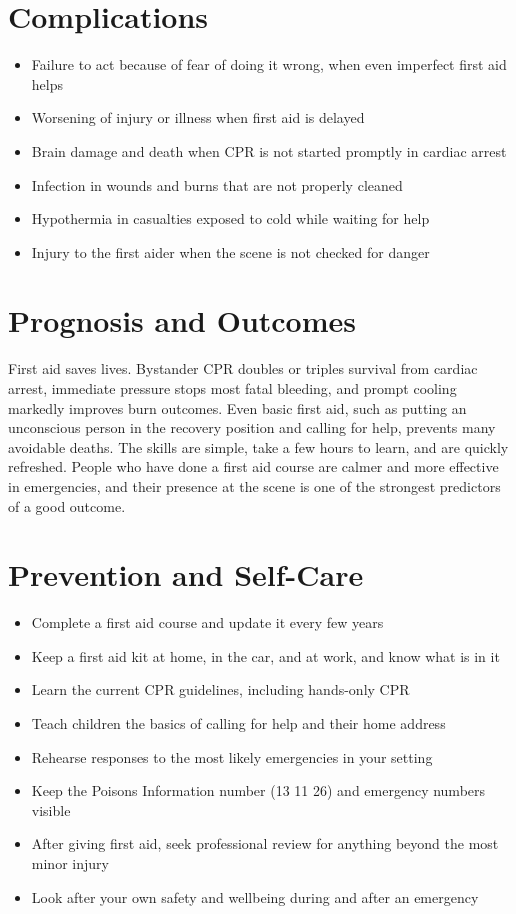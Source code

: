 \section*{Complications}
\begin{itemize}
    \item Failure to act because of fear of doing it wrong, when even imperfect first aid helps
    \item Worsening of injury or illness when first aid is delayed
    \item Brain damage and death when CPR is not started promptly in cardiac arrest
    \item Infection in wounds and burns that are not properly cleaned
    \item Hypothermia in casualties exposed to cold while waiting for help
    \item Injury to the first aider when the scene is not checked for danger
\end{itemize}

\section*{Prognosis and Outcomes}
First aid saves lives. Bystander CPR doubles or triples survival from cardiac arrest, immediate pressure stops most fatal bleeding, and prompt cooling markedly improves burn outcomes. Even basic first aid, such as putting an unconscious person in the recovery position and calling for help, prevents many avoidable deaths. The skills are simple, take a few hours to learn, and are quickly refreshed. People who have done a first aid course are calmer and more effective in emergencies, and their presence at the scene is one of the strongest predictors of a good outcome.

\section*{Prevention and Self-Care}
\begin{itemize}
    \item Complete a first aid course and update it every few years
    \item Keep a first aid kit at home, in the car, and at work, and know what is in it
    \item Learn the current CPR guidelines, including hands-only CPR
    \item Teach children the basics of calling for help and their home address
    \item Rehearse responses to the most likely emergencies in your setting
    \item Keep the Poisons Information number (13 11 26) and emergency numbers visible
    \item After giving first aid, seek professional review for anything beyond the most minor injury
    \item Look after your own safety and wellbeing during and after an emergency
\end{itemize}

